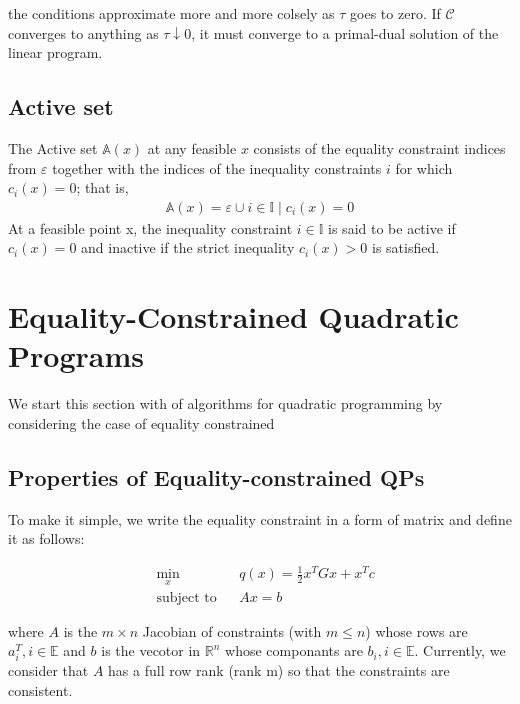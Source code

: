 the conditions approximate more and more colsely as $\tau$ goes to zero. If $\mathcal{C}$ converges to anything as $\tau \downarrow 0$, it must converge to a primal-dual solution of the linear program.


\subsection*{Active set}
The Active set $\mathbb{A}(x)$ at any feasible $x$ consists of the equality constraint indices from $\varepsilon$ together with the indices of the inequality constraints $i$ for which $c_i(x)=0$; that is,
\begin{equation*}
	\begin{aligned}
		\mathbb{A}(x)=\varepsilon \cup {i\in \mathbb{I}\mid c_i(x)=0}
	\end{aligned}
\end{equation*}
At a feasible point x, the inequality constraint $i\in \mathbb{I}$ is said to be active if $c_i(x)=0$ and inactive if the strict inequality $c_i(x)>0$ is satisfied.

\section{Equality-Constrained Quadratic Programs}

We start this section with of algorithms for quadratic programming by considering the case of equality constrained

\subsection*{Properties of Equality-constrained QPs}
To make it simple, we write the equality constraint in a form of matrix and define it as follows:

\begin{equation}
\begin{aligned}
& \underset{x}{\text{min}}
& & q(x)= \frac{1}{2}x^{T}Gx+x^{T}c \\
& \text{subject to} & &  Ax=b
\end{aligned}
\label{eqn:equality_constrained_QP}
\end{equation}

where $A$ is the $m\times n$ Jacobian of constraints (with $m\leqslant n$) whose rows are $a_i^T,i \in \mathbb{E}$ and $b$ is the vecotor in $\mathbb{R}^n$ whose componants are $b_i, i \in \mathbb{E}$. Currently, we consider that $A$ has a full row rank (rank m) so that the constraints are consistent.

